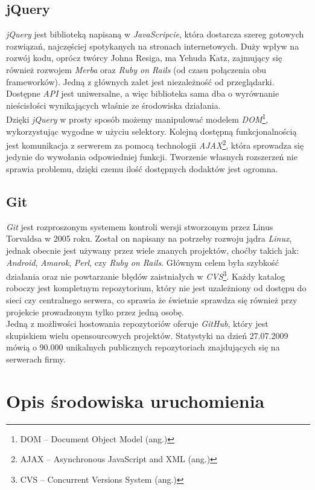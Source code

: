 \documentclass[a4paper,12pt]{article}
\begin{document}
\subsection{jQuery}
\emph{jQuery} jest biblioteką napisaną w \emph{JavaScripcie}, która dostarcza szereg
gotowych rozwiązań, najczęściej spotykanych na stronach internetowych. Duży wpływ na
rozwój kodu, oprócz twórcy Johna Resiga, ma Yehuda Katz, zajmujący się również rozwojem
\emph{Merba} oraz \emph{Ruby on Rails} (od czasu połączenia obu frameworków).
Jedną z głównych zalet jest niezależność od przeglądarki. Dostępne \emph{API} jest
uniwersalne, a więc biblioteka sama dba o wyrównanie nieścisłości wynikających właśnie ze
środowiska działania.\\
Dzięki \emph{jQuery} w prosty sposób możemy manipulować modelem \emph{DOM}\footnote{DOM --
Document Object Model (ang.)}, wykorzystując wygodne w użyciu selektory. Kolejną dostępną
funkcjonalnością jest komunikacja z serwerem za pomocą technologii
\emph{AJAX}\footnote{AJAX -- Asynchronous JavaScript and XML (ang.)}, która sprowadza się
jedynie do wywołania odpowiedniej funkcji. Tworzenie własnych rozszerzeń nie sprawia
problemu, dzięki czemu ilość dostępnych dodaktów jest ogromna.

\subsection{Git}
\emph{Git} jest rozproszonym systemem kontroli wersji stworzonym przez Linus Torvaldsa w 2005 roku.
Został on napisany na potrzeby rozwoju jądra \emph{Linux}, jednak obecnie jest używany
przez wiele znanych projektów, choćby takich jak: \emph{Android}, \emph{Amarok}, \emph{Perl},
czy \emph{Ruby on Rails}. Głównym celem była szybkość działania oraz nie powtarzanie błędów
zaistniałych w \emph{CVS}\footnote{CVS -- Concurrent Versions System (ang.)}.
Każdy katalog roboczy jest kompletnym repozytorium, który nie jest uzależniony od dostępu
do sieci czy centralnego serwera, co sprawia że świetnie sprawdza się również przy projekcie
prowadzonym tylko przez jedną osobę.\\
Jedną z możliwości hostowania repozytoriów oferuje \emph{GitHub}\cite{github}, który jest
skupiskiem wielu opensourcowych projektów. Statystyki na dzień 27.07.2009 mówią o 90.000
unikalnych publicznych repozytoriach znajdujących się na serwerach firmy\cite{github-statistics}.


\clearpage
\section{Opis środowiska uruchomienia}
\end{document}
